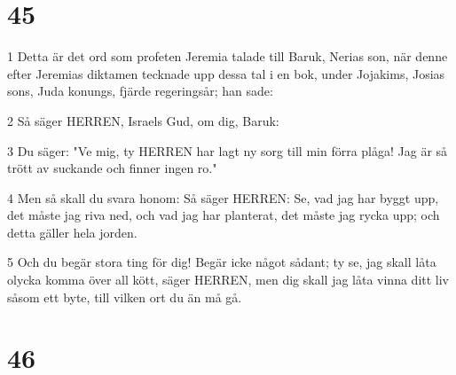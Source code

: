 \chapter{45}

\par 1 Detta är det ord som profeten Jeremia talade till Baruk, Nerias son, när denne efter Jeremias diktamen tecknade upp dessa tal i en bok, under Jojakims, Josias sons, Juda konungs, fjärde regeringsår; han sade:
\par 2 Så säger HERREN, Israels Gud, om dig, Baruk:
\par 3 Du säger: "Ve mig, ty HERREN har lagt ny sorg till min förra plåga! Jag är så trött av suckande och finner ingen ro."
\par 4 Men så skall du svara honom: Så säger HERREN: Se, vad jag har byggt upp, det måste jag riva ned, och vad jag har planterat, det måste jag rycka upp; och detta gäller hela jorden.
\par 5 Och du begär stora ting för dig! Begär icke något sådant; ty se, jag skall låta olycka komma över all kött, säger HERREN, men dig skall jag låta vinna ditt liv såsom ett byte, till vilken ort du än må gå.

\chapter{46}

